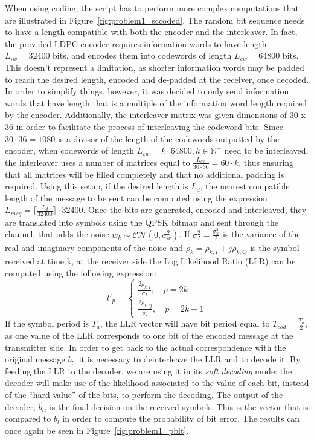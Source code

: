 \documentclass[10pt]{article}
\begin{document}
When using coding, the script has to perform more complex computations that are illustrated in Figure~\ref{fig:problem1_sccoded}. The random bit sequence needs to have a length compatible with both the encoder and the interleaver. In fact, the provided LDPC encoder requires information words to have length $L_{iw} = 32400$ bits, and encodes them into codewords of length $L_{cw} = 64800$ bits. This doesn't represent a limitation, as shorter information words may be padded to reach the desired length, encoded and de-padded at the receiver, once decoded. In order to simplify things, however, it was decided to only send information words that have length that is a multiple of the information word length required by the encoder. Additionally, the interleaver matrix was given dimensions of 30 x 36 in order to facilitate the process of interleaving the codeword bits. Since $30 \cdot 36 = 1080$ is a divisor of the length of the codewords outputted by the encoder, when codewords of length $L_{cw} = k \cdot 64800, k \in \mathbb{N^{+}}$ need to be interleaved, the interleaver uses a number of matrices equal to $\frac{L_{cw}}{30\cdot36} = 60 \cdot k$, thus ensuring that all matrices will be filled completely and that no additional padding is required. Using this setup, if the desired length is $L_d$, the nearest compatible length of the message to be sent can be computed using the expression $L_{msg} = \lceil \frac{L_{d}}{32400} \rceil \cdot 32400$. Once the bits are generated, encoded and interleaved, they are translated into symbols using the QPSK bitmap and sent through the channel, that adds the noise $w_k \sim \mathcal{CN}(0, \sigma_w^2)$. If $\sigma^2_I = \frac{\sigma^2_w}{2}$ is the variance of the real and imaginary components of the noise and $\rho_k = \rho_{k,I} + j \rho_{k,Q}$ is the symbol received at time k, at the receiver side the Log Likelihood Ratio (LLR) can be computed using the following expression:
\begin{equation}
	l'_p =
	\begin{cases}
	\frac{2 \rho_{k,I}}{\sigma_I}, \quad p = 2k \\
	\frac{2 \rho_{k,Q}}{\sigma_I}, \quad p = 2k +1
	\end{cases}
\end{equation}
If the symbol period is $T_a$, the LLR vector will have bit period equal to $T_{cod} = \frac{T_a}{2}$, as one value of the LLR corresponds to one bit of the encoded message at the transmitter side. In order to get back to the actual correspondence with the original message $b_l$, it is necessary to deinterleave the LLR and to decode it. By feeding the LLR to the decoder, we are using it in its \emph{soft decoding} mode: the decoder will make use of the likelihood associated to the value of each bit, instead of the ``hard value'' of the bits, to perform the decoding. %
The output of the decoder, $\hat{b}_l$, is the final decision on the received symbols. This is the vector that is compared to $b_l$ in order to compute the probability of bit error. The results can once again be seen in Figure~\ref{fig:problem1_pbit}. 
\end{document}
